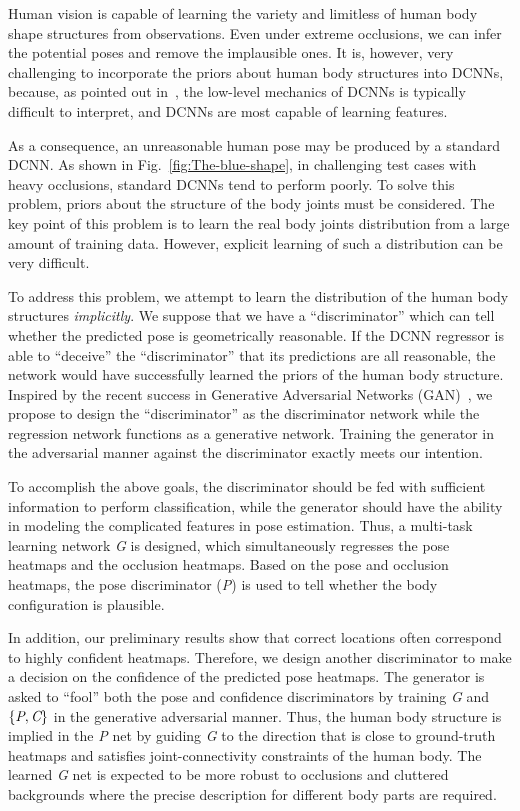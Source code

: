 \documentclass[10pt,letterpaper,twocolumn]{article}
\begin{document}
Human vision is capable of learning the variety and limitless of human body shape structures from observations. Even under extreme occlusions, we
can infer the potential poses and remove the implausible ones. It is, however, very challenging to incorporate the priors about human body structures into DCNNs, because, as pointed out in~\cite{conf/nips/TompsonJLB14}, the low-level mechanics of DCNNs is typically difficult to interpret, and DCNNs are most capable of learning features.

As a consequence, an unreasonable human pose may be produced by a standard DCNN. As shown in Fig.~\ref{fig:The-blue-shape}, in challenging test cases with heavy occlusions, standard DCNNs tend to perform poorly. To solve this problem, priors about the structure of the body joints must be considered. The key point of this problem is to learn the real body joints distribution from a large amount of training data. However, explicit learning of such a distribution can be very difficult.

To address this problem, we attempt to learn the distribution of the human body structures {\em implicitly}. We suppose that we have a ``discriminator'' which can tell whether the predicted pose is geometrically reasonable. If the DCNN regressor is able to ``deceive'' the ``discriminator'' that its predictions are all reasonable, the network would have successfully learned the priors of the human body structure. Inspired by the recent success in Generative Adversarial Networks (GAN)~\cite{journals/corr/RadfordMC15,journals/corr/ZhaoML16,conf/nips/SalimansGZCRCC16,conf/nips/GoodfellowPMXWOCB14,conf/nips/DentonCSF15}, we propose to design the ``discriminator'' as the discriminator network while the regression network functions as a generative network. Training the generator in the adversarial manner against the discriminator exactly meets our intention.

To accomplish the above goals, the discriminator should be fed with sufficient information to perform classification, while the generator should have the ability in modeling the complicated features in pose estimation. Thus, a multi-task learning network \textit{G} is designed, which simultaneously regresses the
pose heatmaps and the occlusion heatmaps. Based on the pose and occlusion heatmaps, the pose discriminator (\textit{P}) is used to tell whether the body configuration is plausible.

In addition, our preliminary results show that correct locations often correspond to highly confident heatmaps. Therefore, we design another discriminator to
make a decision on the confidence of the predicted pose heatmaps. The generator is asked to ``fool'' both the pose and confidence discriminators by training \textit{G} and $\left\{\emph{P},\emph{C}\right\} $ in the generative adversarial manner. Thus, the human body structure  is implied in the \textit{P} net by  guiding \textit{G} to the direction that is close to ground-truth heatmaps and satisfies joint-connectivity constraints of the human body. The learned \textit{G} net is expected to be more robust to occlusions and cluttered backgrounds where the precise description for different body parts are required.
\end{document}
